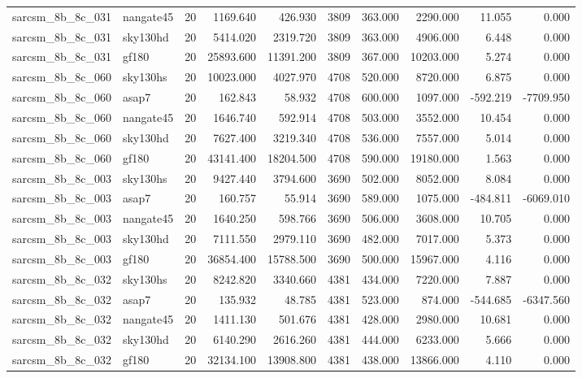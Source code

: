 \begin{tabular}{llrrrrrrrr}
sarcsm\_8b\_8c\_031 & nangate45 & 20 & 1169.640 & 426.930 & 3809 & 363.000 & 2290.000 & 11.055 & 0.000 \\
sarcsm\_8b\_8c\_031 & sky130hd & 20 & 5414.020 & 2319.720 & 3809 & 363.000 & 4906.000 & 6.448 & 0.000 \\
sarcsm\_8b\_8c\_031 & gf180 & 20 & 25893.600 & 11391.200 & 3809 & 367.000 & 10203.000 & 5.274 & 0.000 \\
sarcsm\_8b\_8c\_060 & sky130hs & 20 & 10023.000 & 4027.970 & 4708 & 520.000 & 8720.000 & 6.875 & 0.000 \\
sarcsm\_8b\_8c\_060 & asap7 & 20 & 162.843 & 58.932 & 4708 & 600.000 & 1097.000 & -592.219 & -7709.950 \\
sarcsm\_8b\_8c\_060 & nangate45 & 20 & 1646.740 & 592.914 & 4708 & 503.000 & 3552.000 & 10.454 & 0.000 \\
sarcsm\_8b\_8c\_060 & sky130hd & 20 & 7627.400 & 3219.340 & 4708 & 536.000 & 7557.000 & 5.014 & 0.000 \\
sarcsm\_8b\_8c\_060 & gf180 & 20 & 43141.400 & 18204.500 & 4708 & 590.000 & 19180.000 & 1.563 & 0.000 \\
sarcsm\_8b\_8c\_003 & sky130hs & 20 & 9427.440 & 3794.600 & 3690 & 502.000 & 8052.000 & 8.084 & 0.000 \\
sarcsm\_8b\_8c\_003 & asap7 & 20 & 160.757 & 55.914 & 3690 & 589.000 & 1075.000 & -484.811 & -6069.010 \\
sarcsm\_8b\_8c\_003 & nangate45 & 20 & 1640.250 & 598.766 & 3690 & 506.000 & 3608.000 & 10.705 & 0.000 \\
sarcsm\_8b\_8c\_003 & sky130hd & 20 & 7111.550 & 2979.110 & 3690 & 482.000 & 7017.000 & 5.373 & 0.000 \\
sarcsm\_8b\_8c\_003 & gf180 & 20 & 36854.400 & 15788.500 & 3690 & 500.000 & 15967.000 & 4.116 & 0.000 \\
sarcsm\_8b\_8c\_032 & sky130hs & 20 & 8242.820 & 3340.660 & 4381 & 434.000 & 7220.000 & 7.887 & 0.000 \\
sarcsm\_8b\_8c\_032 & asap7 & 20 & 135.932 & 48.785 & 4381 & 523.000 & 874.000 & -544.685 & -6347.560 \\
sarcsm\_8b\_8c\_032 & nangate45 & 20 & 1411.130 & 501.676 & 4381 & 428.000 & 2980.000 & 10.681 & 0.000 \\
sarcsm\_8b\_8c\_032 & sky130hd & 20 & 6140.290 & 2616.260 & 4381 & 444.000 & 6233.000 & 5.666 & 0.000 \\
sarcsm\_8b\_8c\_032 & gf180 & 20 & 32134.100 & 13908.800 & 4381 & 438.000 & 13866.000 & 4.110 & 0.000 \\

\end{tabular}
